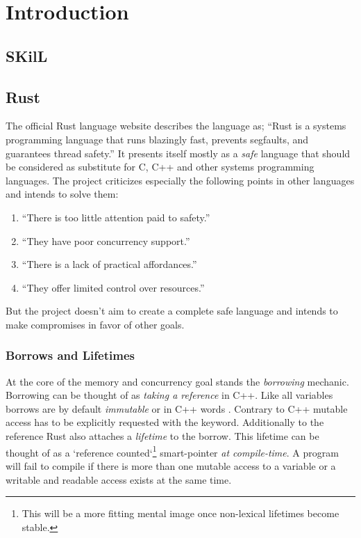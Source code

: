 \documentclass[thesis]{subfiles}
\begin{document}
\chapter{Introduction}

\section{SKilL}

\section{Rust}

  The official Rust language website describes the language as;
  \enquote{Rust is a systems programming language that runs blazingly fast, prevents segfaults, and guarantees thread safety.}\autocite{rustorg}
  It presents itself mostly as a \emph{safe} language that should be considered as substitute for C, C++ and other systems programming languages.
  The project criticizes especially the following points in other languages and intends to solve them:
  \begin{enumerate}
    \item \enquote{There is too little attention paid to safety.}\autocite{rustorg}
    \item \enquote{They have poor concurrency support.}\autocite{rustorg}
    \item \enquote{There is a lack of practical affordances.}\autocite{rustorg}
    \item \enquote{They offer limited control over resources.}\autocite{rustorg}
  \end{enumerate}
  But the project doesn't aim to create a complete safe language and intends to make compromises in favor of other goals.

  \subsection{Borrows and Lifetimes}
    At the core of the memory and concurrency goal stands the \emph{borrowing} mechanic.
    Borrowing can be thought of as \emph{taking a reference} in C++.
    Like all variables borrows are by default \emph{immutable} or in C++ words .
    Contrary to C++ mutable access has to be explicitly requested with the  keyword.
    Additionally to the reference Rust also attaches a \emph{lifetime} to the borrow.
    This lifetime can be thought of as a `reference counted`\footnote{%
      This will be a more fitting mental image once non-lexical lifetimes become stable.
    } smart-pointer \emph{at compile-time}.
    A program will fail to compile if there is more than one mutable access to a variable or a writable and readable access exists at the same time.
\end{document}
